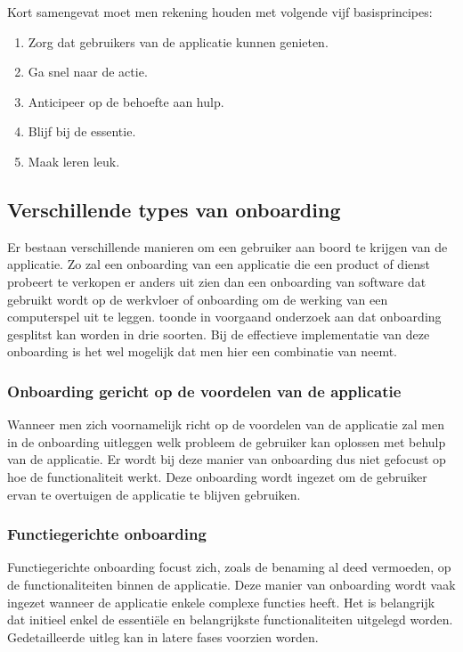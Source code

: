 Kort samengevat moet men rekening houden met volgende vijf basisprincipes:
\begin{enumerate}
    \item Zorg dat gebruikers van de applicatie kunnen genieten.
    \item Ga snel naar de actie.
    \item Anticipeer op de behoefte aan hulp.
    \item Blijf bij de essentie.
    \item Maak leren leuk.
\end{enumerate}

\subsection{Verschillende types van onboarding}
\label{sec:onboarding:types}

Er bestaan verschillende manieren om een gebruiker aan boord te krijgen van de applicatie. Zo zal een onboarding van een applicatie die een product of dienst probeert te verkopen er anders uit zien dan een onboarding van software dat gebruikt wordt op de werkvloer of onboarding om de werking van een computerspel uit te leggen. \textcite{Bufe2020} toonde in voorgaand onderzoek aan dat onboarding gesplitst kan worden in drie soorten. Bij de effectieve implementatie van deze onboarding is het wel mogelijk dat men hier een combinatie van neemt.

\subsubsection{Onboarding gericht op de voordelen van de applicatie}
\label{sec:onboarding:types:voordeel}

Wanneer men zich voornamelijk richt op de voordelen van de applicatie zal men in de onboarding uitleggen welk probleem de gebruiker kan oplossen met behulp van de applicatie. Er wordt bij deze manier van onboarding dus niet gefocust op hoe de functionaliteit werkt. Deze onboarding wordt ingezet om de gebruiker ervan te overtuigen de applicatie te blijven gebruiken.

\subsubsection{Functiegerichte onboarding}
\label{sec:onboarding:types:functie}

Functiegerichte onboarding focust zich, zoals de benaming al deed vermoeden, op de functionaliteiten binnen de applicatie. Deze manier van onboarding wordt vaak ingezet wanneer de applicatie enkele complexe functies heeft. Het is belangrijk dat initieel enkel de essentiële en belangrijkste functionaliteiten uitgelegd worden. Gedetailleerde uitleg kan in latere fases voorzien worden.

